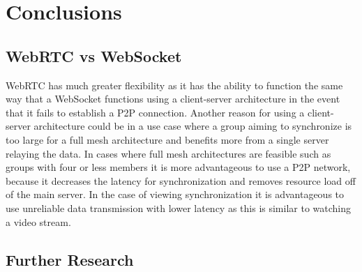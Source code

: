 \documentclass[prodmode,acmtecs]{acmsmall}
\begin{document}
\section{Conclusions}

\subsection{WebRTC vs WebSocket}
WebRTC has much greater flexibility as it has the ability to function the same way that a WebSocket functions using a client-server architecture in the event that it fails to establish a P2P connection. Another reason for using a client-server architecture could be in a use case where a group aiming to synchronize is too large for a full mesh architecture and benefits more from a single server relaying the data. In cases where full mesh architectures are feasible such as groups with four or less members it is more advantageous to use a P2P network, because it decreases the latency for synchronization and removes resource load off of the main server. In the case of viewing synchronization it is advantageous to use unreliable data transmission with lower latency as this is similar to watching a video stream. 

\subsection{Further Research}




\appendix


\end{document}
